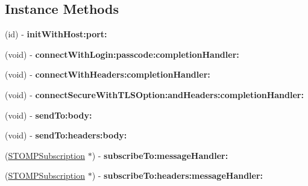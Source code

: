 \subsection*{Instance Methods}
\begin{DoxyCompactItemize}
\item 
(id) -\/ {\bfseries init\+With\+Host\+:port\+:}\hypertarget{interface_s_t_o_m_p_client_ad93cb937c4aac9f274bad21ba35792ea}{}\label{interface_s_t_o_m_p_client_ad93cb937c4aac9f274bad21ba35792ea}

\item 
(void) -\/ {\bfseries connect\+With\+Login\+:passcode\+:completion\+Handler\+:}\hypertarget{interface_s_t_o_m_p_client_aa552d650d12716ea20689a44f0c01369}{}\label{interface_s_t_o_m_p_client_aa552d650d12716ea20689a44f0c01369}

\item 
(void) -\/ {\bfseries connect\+With\+Headers\+:completion\+Handler\+:}\hypertarget{interface_s_t_o_m_p_client_aa685cff3a11eaa877a1b2bc8d8be6954}{}\label{interface_s_t_o_m_p_client_aa685cff3a11eaa877a1b2bc8d8be6954}

\item 
(void) -\/ {\bfseries connect\+Secure\+With\+T\+L\+S\+Option\+:and\+Headers\+:completion\+Handler\+:}\hypertarget{interface_s_t_o_m_p_client_aa9087c7a80399cd97dd681af1e49535f}{}\label{interface_s_t_o_m_p_client_aa9087c7a80399cd97dd681af1e49535f}

\item 
(void) -\/ {\bfseries send\+To\+:body\+:}\hypertarget{interface_s_t_o_m_p_client_aab30b84111b0fe749c9a6d51169d2c0e}{}\label{interface_s_t_o_m_p_client_aab30b84111b0fe749c9a6d51169d2c0e}

\item 
(void) -\/ {\bfseries send\+To\+:headers\+:body\+:}\hypertarget{interface_s_t_o_m_p_client_aeca7f3726eda72c1f3ed48bd12f92e0c}{}\label{interface_s_t_o_m_p_client_aeca7f3726eda72c1f3ed48bd12f92e0c}

\item 
(\hyperlink{interface_s_t_o_m_p_subscription}{S\+T\+O\+M\+P\+Subscription} $\ast$) -\/ {\bfseries subscribe\+To\+:message\+Handler\+:}\hypertarget{interface_s_t_o_m_p_client_a83cd27550fcea6e4d015816fb8ba2d34}{}\label{interface_s_t_o_m_p_client_a83cd27550fcea6e4d015816fb8ba2d34}

\item 
(\hyperlink{interface_s_t_o_m_p_subscription}{S\+T\+O\+M\+P\+Subscription} $\ast$) -\/ {\bfseries subscribe\+To\+:headers\+:message\+Handler\+:}\hypertarget{interface_s_t_o_m_p_client_a9e062e2e945668062458535f61db80f1}{}\label{interface_s_t_o_m_p_client_a9e062e2e945668062458535f61db80f1}


\end{DoxyCompactItemize}

